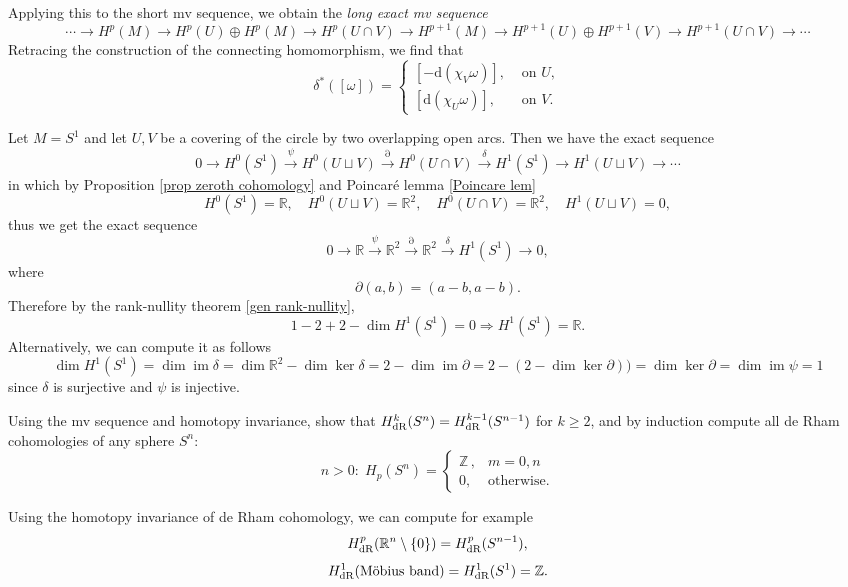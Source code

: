\documentclass[english,letterpaper]{article}%
\numberwithin{equation}{section}
\numberwithin{figure}{section}
\numberwithin{table}{section}
\theoremstyle{definition}
\theoremstyle{definition}
\theoremstyle{definition}
\theoremstyle{plain}
\theoremstyle{plain}
\theoremstyle{plain}
\theoremstyle{plain}
\theoremstyle{remark}
\theoremstyle{remark}
\newcommand{\bbR}{\mathbb{R}}
\newcommand{\bbZ}{\mathbb{Z}}
\newcommand{\dd}{{\mathrm{d}}}
\renewcommand{\geq}{\geqslant}
\DeclareMathOperator{\im}{im}
\begin{document}
Applying this to the short \gls{mv} sequence, we obtain the \emph{long exact \gls{mv} sequence}
\[\cdots\to H^p(M)\to H^p(U)\oplus H^p(M)\to H^p(U\cap V)\to H^{p+1}(M)\to H^{p+1}(U)\oplus H^{p+1}(V)\to H^{p+1}(U\cap V)\to \cdots\]
Retracing the construction of the connecting homomorphism, we find that 
\[\delta^\ast([\omega])=
    \begin{cases}
        [-\dd (\chi_V \omega)],& \text{ on }U,\\
        [\dd (\chi_U \omega)],& \text{ on }V.
    \end{cases}
\]

\begin{example}\label{de Rham of circle}
    Let $M=S^1$ and let $U,V$ be a covering of the circle by two overlapping open arcs. Then we have the exact sequence
    \[0\to H^0(S^1)\overset\psi\to H^0(U\sqcup V)\overset\partial\to H^0(U\cap V)\overset\delta\to H^1(S^1)\to H^1(U\sqcup V)\to \cdots \]
    in which by Proposition \ref{prop zeroth cohomology} and Poincar\'e lemma \ref{Poincare lem}
    \[H^0(S^1)=\bbR,\quad H^0(U\sqcup V)=\bbR^2,\quad H^0(U\cap V)=\bbR^2,\quad H^1(U\sqcup V)=0,\]
    thus we get the exact sequence
    \[0\to \bbR\overset\psi\to \bbR^2\overset{\partial}\to \bbR^2\overset\delta\to H^1(S^1)\to 0,\]
    where
    \[\partial(a,b)=(a-b,a-b).\]
    Therefore by the rank-nullity theorem \ref{gen rank-nullity},
    \[1-2+2-\dim H^1(S^1)=0\Rightarrow H^1(S^1)=\bbR.\]
    Alternatively, we can compute it as follows
    \[\dim H^1(S^1)=\dim \im \delta=\dim \bbR^2-\dim\ker\delta=2-\dim\im \partial=2-(2-\dim\ker\partial))=\dim\ker\partial=\dim\im\psi =1\]
    since $\delta$ is surjective and $\psi$ is injective.
\end{example}


\begin{xca}
    Using the \gls{mv} sequence and homotopy invariance, show that $H_{\rm dR}^k(S^n)=H_{\rm dR}^{k-1}(S^{n-1})$ for $k\geq 2$, and by induction compute all de Rham cohomologies of any sphere $S^n$:
    \[n>0:\; H_p(S^n)=\begin{cases} \bbZ\,, & m=0,n\\ 0, & \text{otherwise.}\end{cases}\]
\end{xca}


\begin{xca}
    Using the homotopy invariance of de Rham cohomology, we can compute for example
    \[H^p_{\rm dR}(\bbR^n\setminus\{0\})=H^p_{\rm dR}(S^{n-1}),\]
    \[H^1_{\rm dR}(\text{M\"obius band})=H^1_{\rm dR}(S^1)=\bbZ.\]
\end{xca}
\end{document}
